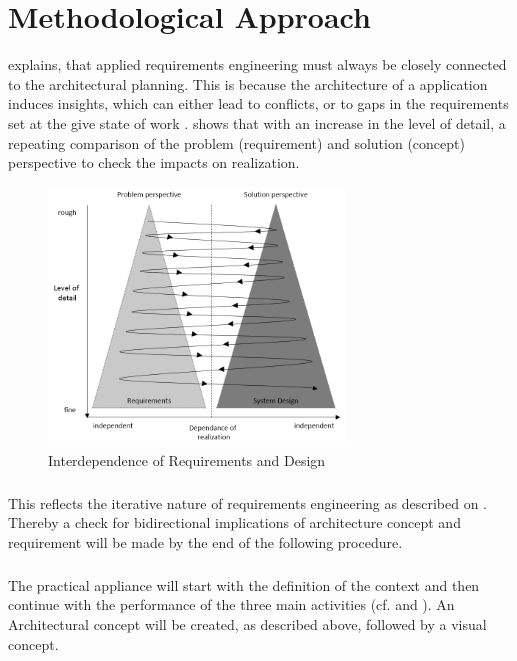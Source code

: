 \chapter{Methodological Approach}
\textcite[22-23]{Pohl.2007} explains, that applied requirements engineering must always be closely connected to the architectural planning. This is because the architecture of a application induces insights, which can either lead to conflicts, or to gaps in the requirements set at the give state of work \parencites[22-23]{Pohl.2007}.  shows that with an increase in the level of detail, a repeating comparison of the problem (requirement) and solution (concept) perspective to check the impacts on realization.

\begin{figure}[H]
    \centering
    \includegraphics[width=0.7\textwidth]{img/iterative.png}
    \caption[Interdependence of Requirements and Design]{Interdependence of Requirements and Design \parencite[23]{Pohl.2007}}
    \label{fig:iterative}
\end{figure}

\paragraph{} This reflects the iterative nature of requirements engineering as described on . Thereby a check for bidirectional implications of architecture concept and requirement will be made by the end of the following procedure.

\paragraph{} The practical appliance will start with the definition of the context and then continue with the performance of the three main activities (cf.  and ). An Architectural concept will be created, as described above, followed by a visual concept. 


